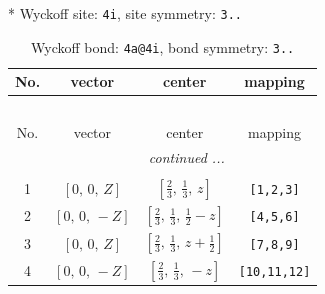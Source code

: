 \documentclass[fleqn,8pt]{jsarticle}
\begin{document}
* Wyckoff site: {\tt 4i}, site symmetry: {\tt 3..}
\renewcommand{\arraystretch}{1.2}
\begin{longtable}{cccc}
\caption{Wyckoff bond: {\tt 4a@4i}, bond symmetry: {\tt 3..}}
 \\
 \hline \hline
No. & vector & center & mapping \\ \hline \endfirsthead

\multicolumn{3}{l}{\tablename\ \thetable{}} \\
 \hline \hline
No. & vector & center & mapping \\ \hline \endhead

 \hline \hline
\multicolumn{3}{r}{\footnotesize\it continued ...} \\ \endfoot

 \hline \hline
\multicolumn{3}{r}{} \\ \endlastfoot

1 & $\left[ 0,\, 0,\, Z \right]$ & $\left[ \frac{2}{3},\, \frac{1}{3},\, z \right]$ & {\tt [1,2,3]} \\ \hline
2 & $\left[ 0,\, 0,\, - Z \right]$ & $\left[ \frac{2}{3},\, \frac{1}{3},\, \frac{1}{2} - z \right]$ & {\tt [4,5,6]} \\ \hline
3 & $\left[ 0,\, 0,\, Z \right]$ & $\left[ \frac{2}{3},\, \frac{1}{3},\, z + \frac{1}{2} \right]$ & {\tt [7,8,9]} \\ \hline
4 & $\left[ 0,\, 0,\, - Z \right]$ & $\left[ \frac{2}{3},\, \frac{1}{3},\, - z \right]$ & {\tt [10,11,12]} \\
\end{longtable}
\renewcommand{\arraystretch}{1.2}
\end{document}
